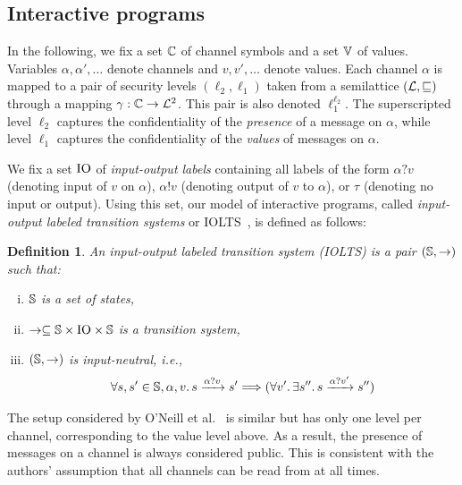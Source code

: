 \documentclass[preprint,5p,twocolumn]{elsarticle}
\newtheorem{definition}[theorem]{Definition}
\begin{document}
\subsection{Interactive programs}

In the following, we fix a set $\mathbb{C}$ of channel symbols and a set $\mathbb{V}$ of values.
Variables $\alpha, \alpha', \dots$ denote channels and $v, v', \dots$ denote values.
Each channel $\alpha$ is mapped to a pair of security levels $(\ell_2,\ell_1)$ taken from a
semilattice $(\mathcal{L}, \sqsubseteq)$ through a mapping $\gamma : \mathbb{C} \rightarrow \mathcal{L}^2$. This pair is also denoted $\ell_1^{\ell_2}$. The superscripted level $\ell_2$ captures
the confidentiality of the \emph{presence} of a message on $\alpha$, while level 
$\ell_1$ captures the confidentiality of the \emph{values} of messages on $\alpha$.

We fix a set $\mathrm{IO}$ of \emph{input-output labels} containing all labels of the form
$\alpha ? v$ (denoting input of $v$ on $\alpha$), $\alpha ! v$ (denoting output of $v$ to $\alpha$), or $\tau$ (denoting no input or output). Using this set, our model of interactive programs, called
\emph{input-output labeled transition systems} or IOLTS~\cite{Rafnsson2012}, is defined as follows:

\begin{definition}
  An \emph{input-output labeled transition system} (IOLTS) is a pair $(\mathbb{S}, \rightarrow)$ such that:
  \begin{enumerate}[(i)]
  \item $\mathbb{S}$ is a set of states,
  \item $\rightarrow \subseteq \mathbb{S} \times \mathrm{IO} \times \mathbb{S}$ is a transition system,
  \item $(\mathbb{S}, \rightarrow)$ is \emph{input-neutral}, i.e.,
  \begin{align*}
    \forall s, s' \in \mathbb{S}, \alpha, v.\, s \xrightarrow{\alpha ? v} s' \Longrightarrow (\forall v'.\,\exists s''.\,s \xrightarrow{\alpha ? v'} s'')
  \end{align*}
  \end{enumerate}
\end{definition}

The setup considered by O'Neill et al.~\cite{ONeill2006} is similar but has only one level
per channel, corresponding to the value level above. As a result, the presence of messages on a
channel is always considered public. This is consistent with the authors' assumption that
all channels can be read from at all times.
\end{document}
